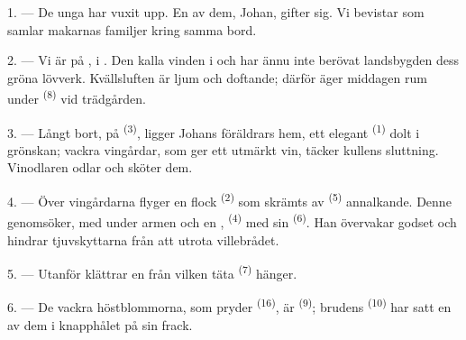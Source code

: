 
\VUsaut{4.0mm}
\VUsaut{1.6mm}
\VUsaut{3.2mm}

\VUsaut{1.6mm}
\VUsaut{2.6mm}

\VUsaut{3.0mm}

1. --- De unga har vuxit upp. En av dem, Johan, gifter sig. Vi bevistar
 som samlar makarnas familjer kring samma bord.

2. --- Vi är på , i . Den kalla vinden i
 och  har ännu inte berövat landsbygden dess
gröna lövverk. Kvällsluften är ljum och doftande; därför äger middagen rum under
 \textsuperscript{(8)} vid trädgården.

3. --- Långt bort, på  \textsuperscript{(3)}, ligger Johans
föräldrars hem, ett elegant  \textsuperscript{(1)} dolt i
grönskan; vackra vingårdar, som ger ett utmärkt vin, täcker kullens sluttning.
Vinodlaren odlar och sköter dem.

4. --- Över vingårdarna flyger en flock  \textsuperscript{(2)}
som skrämts av  \textsuperscript{(5)} annalkande. Denne
genomsöker, med  under armen och en ,  \textsuperscript{(4)} med sin 
\textsuperscript{(6)}. Han övervakar godset och hindrar tjuvskyttarna från att
utrota villebrådet.

5. --- Utanför  klättrar en  från vilken
täta  \textsuperscript{(7)} hänger.

6. --- De vackra höstblommorna, som pryder 
\textsuperscript{(16)}, är  \textsuperscript{(9)}; brudens
 \textsuperscript{(10)} har satt en av dem i knapphålet på sin frack.

